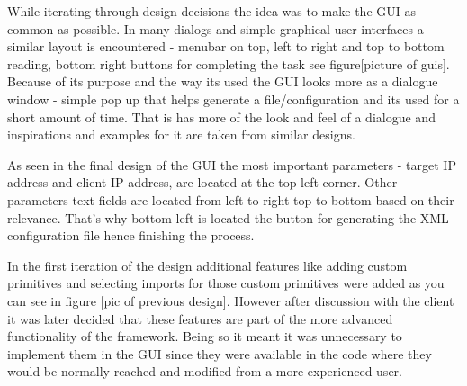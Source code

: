 While iterating through design decisions the idea was to make the GUI as common as possible. In many dialogs
and simple graphical user interfaces a similar layout is encountered - menubar on top, left to right and
top to bottom reading, bottom right buttons for completing the task see figure[picture of guis]. Because
of its purpose and the way its used the GUI looks more as a dialogue window - simple pop up that helps 
generate a file/configuration and its used for a short amount of time. That is has more of the look and feel of
a dialogue and inspirations and examples for it are taken from similar designs.

As seen in the final design of the GUI the most important parameters - target IP address and client IP address,
are located at the top left corner. Other parameters text fields are located from left  to right top to bottom
based on their relevance. That's why bottom left is located the button for generating the XML configuration
file hence finishing the process.

In the first iteration of the design additional features like adding custom primitives and selecting imports
for those custom primitives were added as you can see in figure [pic of previous design]. However after discussion with the client it was later
decided that these features are part of the more advanced functionality of the framework. Being so it meant
it was unnecessary to implement them in the GUI since they were available in the code where they would be 
normally reached and modified from a more experienced user.


